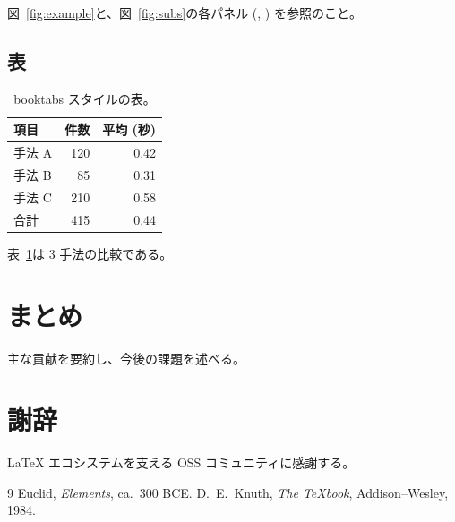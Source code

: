 \documentclass[a4paper,11pt]{ltjsarticle}
\theoremstyle{plain}
\theoremstyle{definition}
\theoremstyle{remark}
\begin{document}
図~\ref{fig:example}と、図~\ref{fig:subs}の各パネル
(, ) を参照のこと。

\subsection{表}

\begin{table}[ht]
  \centering
  \caption{booktabs スタイルの表。}
  \label{tab:example}
  \begin{tabular}{lrr}
    \toprule
    項目     & 件数 & 平均 (秒) \\
    \midrule
    手法 A   &  120 & 0.42 \\
    手法 B   &   85 & 0.31 \\
    手法 C   &  210 & 0.58 \\
    \midrule
    合計     &  415 & 0.44 \\
    \bottomrule
  \end{tabular}
\end{table}

表~\ref{tab:example}は 3 手法の比較である。

\section{まとめ}

主な貢献を要約し、今後の課題を述べる。

\section*{謝辞}

LaTeX エコシステムを支える OSS コミュニティに感謝する。

\begin{thebibliography}{9}
    Euclid, \emph{Elements}, ca.\ 300 BCE.
    D.~E.\ Knuth, \emph{The \TeX book}, Addison--Wesley, 1984.
\end{thebibliography}
\end{document}
